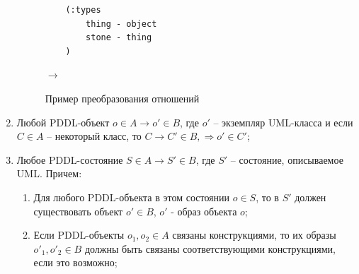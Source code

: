 \documentclass[a4paper,14pt]{extreport}
\begin{document}
\begin{enumerate}
\begin{figure}[H]
    \hfill
    \begin{minipage}[h]{0.40\linewidth}
        {\raggedright
        \begin{verbatim}
    (:types
        thing - object
        stone - thing
    )
        \end{verbatim} 
        }
    \end{minipage}
    \hfill
    $\rightarrow$
    \hfill
    \begin{minipage}[h]{0.45\linewidth}
    \end{minipage}
    \caption{Пример преобразования отношений}
    \label{img:property-relations}
\end{figure}

        \item Любой PDDL-объект $o \in A \to o' \in B$, где $o'$ -- экземпляр UML-класса и если $C \in A$ -- некоторый класс, то $C \to C' \in B, \Rightarrow o' \in C'$;
        \item Любое PDDL-состояние $S \in A \to S' \in B$, где $S'$ -- состояние, описываемое UML. Причем:
        \begin{enumerate}
            \item  Для любого PDDL-объекта в этом состоянии $o \in S$, то в $S'$ должен существовать объект $o' \in B$, $o'$ - образ объекта $o$;
            \item  Если PDDL-объекты $o_1, o_2 \in A$ связаны конструкциями, то их образы $o'_1, o'_2 \in B$ должны быть связаны соответствующими конструкциями, если это возможно;
             

\end{enumerate}
\end{enumerate}
\end{document}
